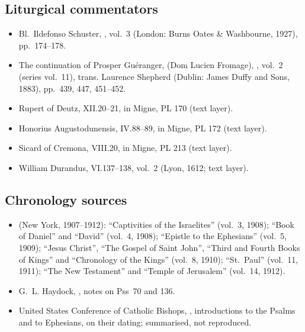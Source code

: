 {\subsection*{Liturgical commentators}
\begin{itemize}
\item Bl.\ Ildefonso Schuster, , vol.~3 (London: Burns Oates \& Washbourne, 1927), pp.~174--178.
\item The continuation of Prosper Guéranger,  (Dom Lucien Fromage), , vol.~2 (series vol.~11), trans. Laurence Shepherd (Dublin: James Duffy and Sons, 1883), pp.~439, 447, 451--452.
\item Rupert of Deutz,  XII.20--21, in Migne, PL 170 (text layer).
\item Honorius Augustodunensis,  IV.88--89, in Migne, PL 172 (text layer).
\item Sicard of Cremona,  VIII.20, in Migne, PL 213 (text layer).
\item William Durandus,  VI.137--138, vol.~2 (Lyon, 1612; text layer).
\end{itemize}

\subsection*{Chronology sources}
\begin{itemize}
\item {} (New York, 1907--1912): ``Captivities of the Israelites'' (vol.~3, 1908); ``Book of Daniel'' and ``David'' (vol.~4, 1908); ``Epistle to the Ephesians'' (vol.~5, 1909); ``Jesus Christ'', ``The Gospel of Saint John'', ``Third and Fourth Books of Kings'' and ``Chronology of the Kings'' (vol.~8, 1910); ``St.\ Paul'' (vol.~11, 1911); ``The New Testament'' and ``Temple of Jerusalem'' (vol.~14, 1912).
\item G.~L. Haydock, , notes on Pss~70 and 136.
\item United States Conference of Catholic Bishops, , introductions to the Psalms and to Ephesians, on their dating; summarised, not reproduced.
\end{itemize}
\par}
